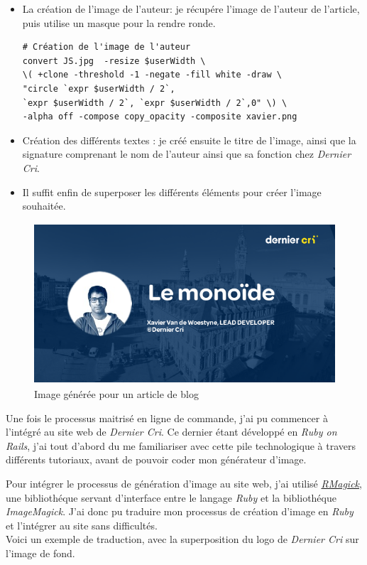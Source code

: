 \begin{itemize}
\item
  La création de l'image de l'auteur: je récupére l'image de l'auteur de
  l'article, puis utilise un masque pour la rendre ronde.

\begin{verbatim}
# Création de l'image de l'auteur
convert JS.jpg  -resize $userWidth \
\( +clone -threshold -1 -negate -fill white -draw \
"circle `expr $userWidth / 2`,
`expr $userWidth / 2`, `expr $userWidth / 2`,0" \) \
-alpha off -compose copy_opacity -composite xavier.png
\end{verbatim}
\item
  Création des différents textes : je créé ensuite le titre de l'image,
  ainsi que la signature comprenant le nom de l'auteur ainsi que sa
  fonction chez \emph{Dernier Cri}.
\item
  Il suffit enfin de superposer les différents éléments pour créer
  l'image souhaitée.
\end{itemize}

\begin{figure}[h]
  \centering
  \includegraphics[height=6cm]{figures/blog.png}
  \caption{Image générée pour un article de blog}
\end{figure}

\bigskip

Une fois le processus maitrisé en ligne de commande, j'ai pu commencer à
l'intégré au site web de \emph{Dernier Cri}. Ce dernier étant développé
en \emph{Ruby on Rails}, j'ai tout d'abord du me familiariser avec cette
pile technologique à travers différents tutoriaux, avant de pouvoir
coder mon générateur d'image.

\bigskip

Pour intégrer le processus de génération d'image au site web, j'ai
utilisé \href{https://github.com/rmagick/rmagick}{\emph{RMagick}}, une
bibliothéque servant d'interface entre le langage \emph{Ruby} et la
bibliothéque \emph{ImageMagick}. J'ai donc pu traduire mon processus de
création d'image en \emph{Ruby} et l'intégrer au site sans
difficultés.\\
Voici un exemple de traduction, avec la superposition du logo de
\emph{Dernier Cri} sur l'image de fond.

